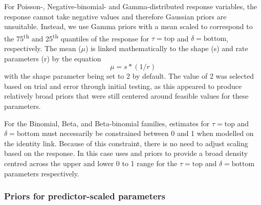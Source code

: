 \documentclass[
  shortnames]{jss}
\begin{document}
For Poisson-, Negative-binomial- and Gamma-distributed response variables, the response cannot take negative values and therefore Gaussian priors are unsuitable. Instead, we use Gamma priors with a mean scaled to correspond to the 75\textsuperscript{th} and 25\textsuperscript{th} quantiles of the response for \(\tau = \text{top}\) and \(\delta = \text{bottom}\), respectively. The mean (\(\mu\)) is linked mathematically to the shape (s) and rate parameters (r) by the equation \[ \mu = s * (1/r) \] \citep{Becker1988} with the shape parameter being set to 2 by default. The value of 2 was selected based on trial and error through initial testing, as this appeared to produce relatively broad priors that were still centered around feasible values for these parameters.

For the Binomial, Beta, and Beta-binomial families, estimates for \(\tau = \text{top}\) and \(\delta = \text{bottom}\) must necessarily be constrained between 0 and 1 when modelled on the identity link. Because of this constraint, there is no need to adjust scaling based on the response. In this case  uses  and  priors to provide a broad density centred across the upper and lower 0 to 1 range for the \(\tau = \text{top}\) and \(\delta = \text{bottom}\) parameters respectively.

\hypertarget{priors-for-predictor-scaled-parameters}{%
\subsubsection{Priors for predictor-scaled parameters}\label{priors-for-predictor-scaled-parameters}}
\end{document}
